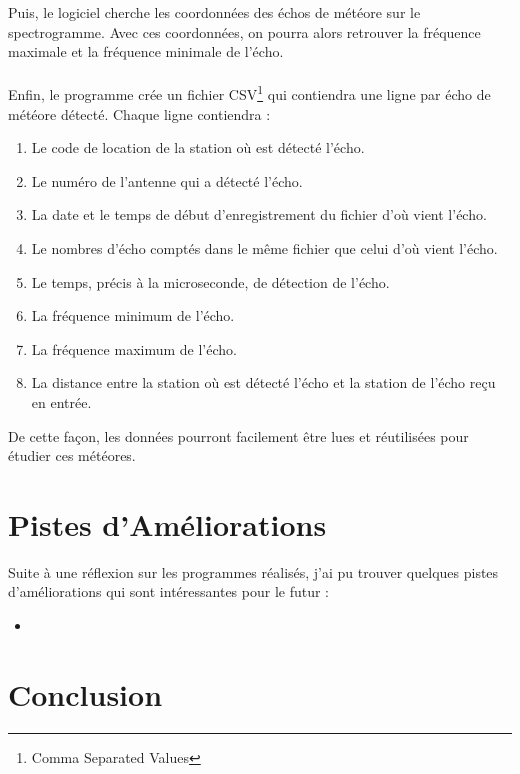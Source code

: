 \documentclass[11pt]{article}
\begin{document}
Puis, le logiciel cherche les coordonnées des échos de météore sur le spectrogramme.
Avec ces coordonnées, on pourra alors retrouver la fréquence maximale et la fréquence minimale de l'écho.\\
\\
Enfin, le programme crée un fichier CSV\footnote{Comma Separated Values} qui contiendra une ligne par écho de météore détecté.
Chaque ligne contiendra :
\begin{enumerate}
    \item Le code de location de la station où est détecté l'écho.
    \item Le numéro de l'antenne qui a détecté l'écho.
    \item La date et le temps de début d'enregistrement du fichier d'où vient l'écho.
    \item Le nombres d'écho comptés dans le même fichier que celui d'où vient l'écho.
    \item Le temps, précis à la microseconde, de détection de l'écho.
    \item La fréquence minimum de l'écho.
    \item La fréquence maximum de l'écho.
    \item La distance entre la station où est détecté l'écho et la station de l'écho reçu en entrée.
\end{enumerate}

De cette façon, les données pourront facilement être lues et réutilisées pour étudier ces météores.

\newpage

\section{Pistes d'Améliorations}

Suite à une réflexion sur les programmes réalisés, j'ai pu trouver quelques pistes d'améliorations qui sont intéressantes pour le futur : 
\begin{itemize}
    \item 
\end{itemize}

\newpage

\section{Conclusion}
\end{document}
